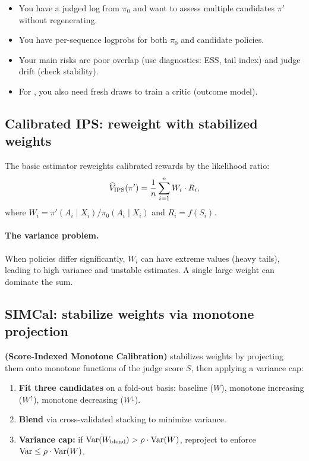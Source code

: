 \begin{itemize}
\item You have a judged log from $\pi_0$ and want to assess multiple candidates $\pi'$ without regenerating.
\item You have per-sequence logprobs for both $\pi_0$ and candidate policies.
\item Your main risks are poor overlap (use diagnostics: ESS, tail index) and judge drift (check stability).
\item For \dr, you also need fresh draws to train a critic (outcome model).
\end{itemize}

\subsection{Calibrated IPS: reweight with stabilized weights}

The basic \ips{} estimator reweights calibrated rewards by the likelihood ratio:
\begin{equation}
\widehat{V}_{\text{IPS}}(\pi') = \frac{1}{n} \sum_{i=1}^n W_i \cdot R_i,
\end{equation}
where $W_i = \pi'(A_i \mid X_i) / \pi_0(A_i \mid X_i)$ and $R_i = f(S_i)$.

\paragraph{The variance problem.} When policies differ significantly, $W_i$ can have extreme values (heavy tails), leading to high variance and unstable estimates. A single large weight can dominate the sum.

\subsection{SIMCal: stabilize weights via monotone projection}

\textbf{\simcal{} (Score-Indexed Monotone Calibration)} stabilizes weights by projecting them onto monotone functions of the judge score $S$, then applying a variance cap:

\begin{enumerate}
\item \textbf{Fit three candidates} on a fold-out basis: baseline ($W$), monotone increasing ($W^\uparrow$), monotone decreasing ($W^\downarrow$).
\item \textbf{Blend} via cross-validated stacking to minimize variance.
\item \textbf{Variance cap:} if $\operatorname{Var}(W_{\text{blend}}) > \rho \cdot \operatorname{Var}(W)$, reproject to enforce $\operatorname{Var} \le \rho \cdot \operatorname{Var}(W)$.
\end{enumerate}

